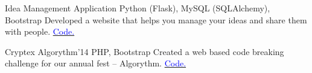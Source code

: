     {Idea Management Application}
    {}
    {\scriptsize Python (Flask), MySQL (SQLAlchemy), Bootstrap}
    {}
    {
        Developed a website that helps you manage your ideas and share them with people.
        \href{http://github.com/ideabin/ideabin/}{\textcolor{blue}{\scriptsize Code.}}
    }
    \vspace*{0.2\baselineskip}

    {Cryptex}
    {Algorythm'14}
    {\scriptsize PHP, Bootstrap}
    {}
    {
        Created a web based code breaking challenge for our annual fest -- Algorythm.
        \href{http://github.com/jdevlabs/cryptex/}{\textcolor{blue}{\scriptsize Code.}}
    }
    \vspace*{0.2\baselineskip}

